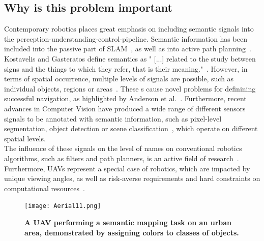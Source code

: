 \documentclass[twocolumn,letterpaper]{IEEEAerospaceCLS}  %
\begin{document}
\subsection{Why is this problem important}
Contemporary robotics places great emphasis on including semantic signals into the perception-understanding-control-pipeline. Semantic information has been included into the passive part of SLAM~\cite{cadena_past_2016,zhang_hierarchical_2019}, as well as into active path planning~\cite{koch_automatic_2019,alirezaie_exploiting_2017}. Kostavelis and Gasteratos define semantics as " [...] related to the study between signs and the things to which they refer, that is their meaning."~\cite{kostavelis_semantic_2015}. However, in terms of spatial occurrence, multiple levels of signals are possible, such as individual objects, regions or areas~\cite{kostavelis_semantic_2015}. These s cause novel problems for definining successful navigation, as highlighted by Anderson et al.~\cite{anderson_evaluation_2018}. Furthermore, recent advances in Computer Vision have produced a wide range of different sensors signals to be annotated with semantic information, such as pixel-level segmentation, object detection or scene classification~\cite{alom_history_2018}, which operate on different spatial levels.\\
The influence of these signals on the level of names on conventional robotics algorithms, such as filters and path planners, is an active field of research~\cite{kostavelis_semantic_2015,cadena_past_2016,anderson_evaluation_2018}. Furthermore, UAVs represent a special case of robotics, which are impacted by unique viewing angles, as well as risk-averse requirements and hard constraints on computational resources~\cite{mandel_method_2020,gonzalez_unmanned_2016}.
\begin{figure}
    \centering
    \texttt{[image: Aerial11.png]}\\
    \caption{\bf{A UAV performing a semantic mapping task on an urban area, demonstrated by assigning colors to classes of objects.}}
    \label{fig:AerialImg}
\end{figure}
\end{document}
